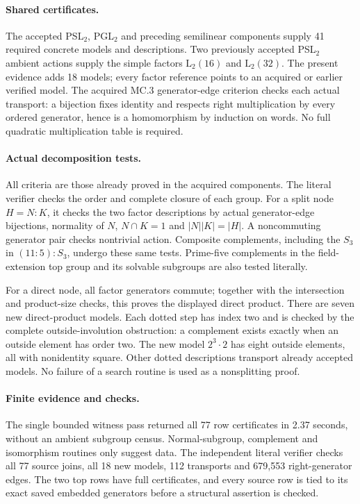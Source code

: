 \documentclass[11pt]{article}
\begin{document}
\paragraph{Shared certificates.}
The accepted PSL$_2$, PGL$_2$ and preceding semilinear components supply
41 required concrete models and descriptions. Two previously accepted
PSL$_2$ ambient actions supply the simple factors $\mathrm L_2(16)$ and
$\mathrm L_2(32)$. The present evidence adds 18 models; every factor
reference points to an acquired or earlier verified model. The acquired
MC.3 generator-edge criterion checks each actual transport: a bijection
fixes identity and respects right multiplication by every ordered
generator, hence is a homomorphism by induction on words. No full
quadratic multiplication table is required.

\newpage
\paragraph{Actual decomposition tests.}
All criteria are those already proved in the acquired components. The
literal verifier checks the order and complete closure of each group.
For a split node $H=N:K$, it checks the two factor descriptions by actual
generator-edge bijections, normality of $N$, $N\cap K=1$ and
$|N||K|=|H|$. A noncommuting generator pair checks nontrivial action.
Composite complements, including the $S_3$ in $(11:5):S_3$, undergo these
same tests. Prime-five complements in the field-extension top group and
its solvable subgroups are also tested literally.

For a direct node, all factor generators commute; together with the
intersection and product-size checks, this proves the displayed direct
product. There are seven new direct-product models. Each dotted step has
index two and is checked by the complete outside-involution obstruction:
a complement exists exactly when an outside element has order two.
The new model $2^3\mathbin{\cdot}2$ has eight outside elements, all with
nonidentity square. Other dotted descriptions transport already accepted
models. No failure of a search routine is used as a nonsplitting proof.

\paragraph{Finite evidence and checks.}
The single bounded witness pass returned all 77 row certificates in
2.37 seconds, without an ambient subgroup census. Normal-subgroup,
complement and isomorphism routines only suggest data. The independent
literal verifier checks all 77 source joins, all 18 new models,
112 transports and 679,553 right-generator edges. The two top rows have
full certificates, and every source row is tied to its exact saved
embedded generators before a structural assertion is checked.
\end{document}
